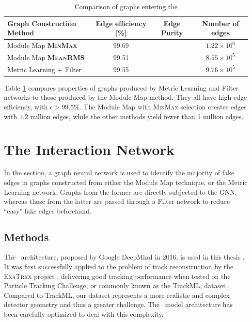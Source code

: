 \begin{table}[h!]
    \centering
    \begin{tabular}{l|c|c|c}
      Graph Construction Method  & Edge efficiency [\%] & Edge Purity & Number of edges  \\
      \hline \hline
        Module Map \textbf{\textsc{MinMax}} & 99.69 & & $1.22\times 10^6$ \\
        Module Map \textbf{\textsc{MeanRMS}} & 99.51  & & $8.55\times 10^5$ \\
        Metric Learning + Filter & 99.55  & & $9.76\times 10^5$\\
        \hline
    \end{tabular}
    \caption{Comparison of graphs entering the \ignn}
    \label{tab:graph-contruction-comparison}
\end{table}

Table \ref{tab:graph-contruction-comparison} compares properties of graphs produced by Metric Learning and Filter networks to those produced by the Module Map method. 
They all have high edge efficiency, with $\epsilon> 99.5\%$. 
The Module Map with \textsc{MinMax} selection creates edges with $1.2$ million edges, while the other methods yield fewer than 1 million edges. 

\section{The Interaction Network}
\label{sect:ignn}

In the section, a graph neural network is used to identify the majority of fake edges in graphs constructed from either the Module Map technique, or the Metric Learning network.
Graphs from the former are directly subjected to the GNN, whereas those from the latter are passed through a Filter network to reduce ``easy" fake edges beforehand.

\subsection{Methods}

The \ignn~architecture, proposed by Google DeepMind in 2016, 
is used in this thesis \cite{interaction-gnn}. 
It was first successfully applied to the problem of track reconstruction by the \textsc{ExaTrkx} project \cite{exatrkx}, delivering good tracking performance when tested on the Particle Tracking Challenge, or commonly known as the TrackML, dataset \cite{trackml-particle-identification}.
Compared to TrackML, our dataset represents a more realistic and complex detector geometry and thus a greater challenge. 
The \ignn~model architecture has been carefully optimized to deal with this complexity. 

